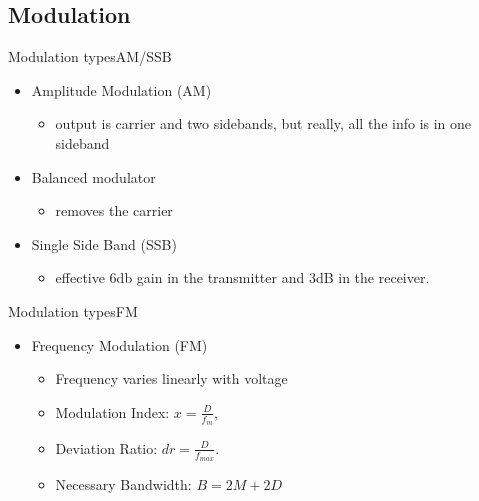 \documentclass{beamer}
\begin{document}





\subsection{Modulation}
\begin{frame}{Modulation types}{AM/SSB}
\begin{itemize}
\item Amplitude Modulation (AM)
\begin{itemize}
\item output is carrier and two sidebands, but really, all the info is in one sideband
\end{itemize}
\item Balanced modulator
\begin{itemize}
\item removes the carrier
\end{itemize}
\item Single Side Band (SSB)
\begin{itemize}
\item effective 6db gain in the transmitter and 3dB in the receiver.
\end{itemize}
\end{itemize}
\end{frame}

\begin{frame}{Modulation types}{FM}
\begin{itemize}
\item Frequency Modulation (FM)
\begin{itemize}
\item Frequency varies linearly with voltage
\item Modulation Index: $x=\frac{D}{f_m}$, 
\item Deviation Ratio: $dr=\frac{D}{f_{max}}$.
\item Necessary Bandwidth: $B=2M+2D$
\end{itemize}
\end{itemize}
\end{frame}
\end{document}
